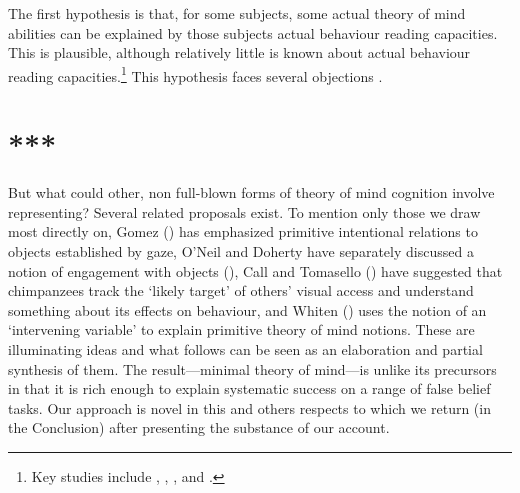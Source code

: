 \documentclass[12pt,\papersize]{extarticle}
\begin{document}
The first hypothesis is that, for some subjects, some actual theory of mind abilities can be explained by those subjects actual behaviour reading capacities.
This is plausible, although relatively little is known about actual behaviour reading capacities.\footnote{
Key studies include
	\citet{Newtson:1976ni}, 
	\citet{Byrne:1999jk},
	\citet{Baldwin:2001rs},
	\citet{Saylor:2007pj} and
	\citet{Baldwin:2008mw}.
}
This hypothesis faces several objections \citep[]{en_1553, Clayton:2007fh, en_1691, en_1393}. 




\section{***}

But what could other, non full-blown forms of theory of mind cognition involve representing?
Several related proposals exist.  
To mention only those we draw most directly on, Gomez (\citeyear[][p.\ 730]{en_1259}) has emphasized primitive intentional relations to objects established by gaze, O’Neil and Doherty have separately discussed a notion of engagement with objects (\citealp{en_1159, en_1140}), Call and Tomasello (\citeyear[][p.\ 58]{en_1669}) have suggested that chimpanzees track the `likely target' of others’ visual access and understand something about its effects on behaviour, and Whiten (\citeyear[]{en_1415, en_1416}) uses the notion of an `intervening variable' to explain primitive theory of mind notions.  These are illuminating ideas and what follows can be seen as an elaboration and partial synthesis of them.  
The result---minimal theory of mind---is unlike its precursors in that it is rich enough to explain systematic success on a range of false belief tasks.  Our approach is novel in this and others respects to which we return (in the Conclusion) after presenting the substance of our account.








































\small

\end{document}
